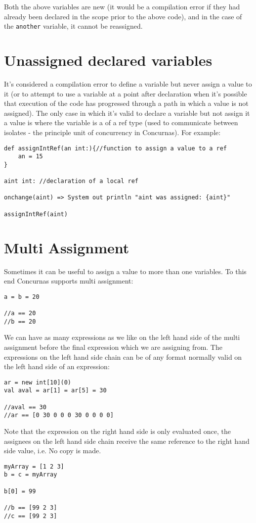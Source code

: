 \documentclass[conc-doc]{subfiles}
\begin{document}
Both the above variables are new (it would be a compilation error if they had already been declared in the scope prior to the above code), and in the case of the \lstinline{another} variable, it cannot be reassigned.

\section{Unassigned declared variables}
It's considered a compilation error to define a variable but never assign a value to it (or to attempt to use a variable at a point after declaration when it's possible that execution of the code has progressed through a path in which a value is not assigned). The only case in which it's valid to declare a variable but not assign it a value is where the variable is a of a ref type (used to communicate between isolates - the principle unit of concurrency in Concurnas). For example:
\begin{lstlisting}
def assignIntRef(an int:){//function to assign a value to a ref
	an = 15
}

aint int: //declaration of a local ref

onchange(aint) => System out println "aint was assigned: {aint}"

assignIntRef(aint)
\end{lstlisting}

\section{Multi Assignment}
Sometimes it can be useful to assign a value to more than one variables. To this end Concurnas supports multi assignment:

\begin{lstlisting}
a = b = 20

//a == 20
//b == 20
\end{lstlisting}

We can have as many expressions as we like on the left hand side of the multi assignment before the final expression which we are assigning from. The expressions on the left hand side chain can be of any format normally valid on the left hand side of an expression:
\begin{lstlisting}
ar = new int[10](0)
val aval = ar[1] = ar[5] = 30

//aval == 30
//ar == [0 30 0 0 0 30 0 0 0 0]
\end{lstlisting}

Note that the expression on the right hand side is only evaluated once, the assignees on the left hand side chain receive the same reference to the right hand side value, i.e. No copy is made.
\begin{lstlisting}
myArray = [1 2 3]
b = c = myArray

b[0] = 99

//b == [99 2 3]
//c == [99 2 3]
\end{lstlisting}
\end{document}
